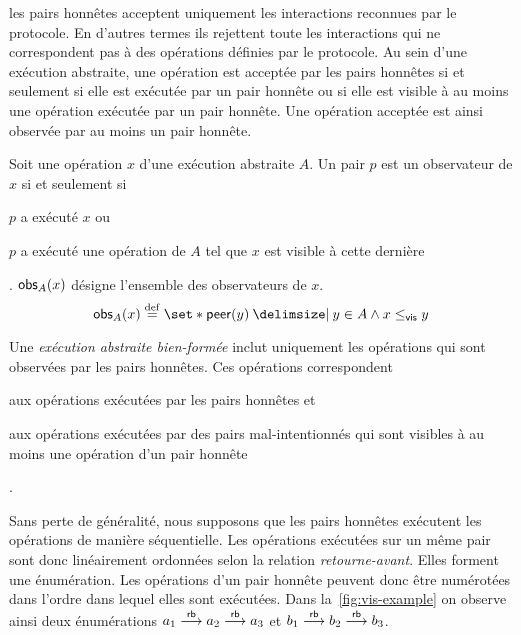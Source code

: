 les pairs honnêtes acceptent uniquement les interactions reconnues par le protocole.
En d'autres termes ils rejettent toute les interactions qui ne correspondent pas à des opérations définies par le protocole.
Au sein d'une exécution abstraite, une opération est acceptée par les pairs honnêtes si et seulement si elle est exécutée par un pair honnête ou si elle est visible à au moins une opération exécutée par un pair honnête.
Une opération acceptée est ainsi observée par au moins un pair honnête.

\begin{definition}[Observateurs]\label{def:op-obs}
Soit une opération $x$ d'une exécution abstraite $A$.
Un pair $p$ est un observateur de $x$ si et seulement si \begin{inlinelist}\item $p$ a exécuté $x$ ou \item $p$ a exécuté une opération de $A$ tel que $x$ est visible à cette dernière\end{inlinelist}.
$\operatorname{\mathsf{obs}}_A(x)$ désigne l'ensemble des observateurs de $x$.
\begin{equation*}
  \trm{obs}_A(x) \defeq \set*{ \trm{peer}(y) \given y \in A \land x \viseq y}
\end{equation*}
\end{definition}

Une \emph{exécution abstraite bien-formée} inclut uniquement les opérations qui sont observées par les pairs honnêtes.
Ces opérations correspondent \begin{inlinelist}
    \item aux opérations exécutées par les pairs honnêtes et
    \item aux opérations exécutées par des pairs mal-intentionnés qui sont visibles à au moins une opération d'un pair honnête
\end{inlinelist}.

Sans perte de généralité, nous supposons que les pairs honnêtes exécutent les opérations de manière séquentielle.
Les opérations exécutées sur un même pair sont donc linéairement ordonnées selon la relation \emph{retourne-avant}.
Elles forment une énumération.
Les opérations d'un pair honnête peuvent donc être numérotées dans l'ordre dans lequel elles sont exécutées.
Dans la~\autoref{fig:vis-example} on observe ainsi deux énumérations $a_1 \overset{\mathsf{rb}}{\longrightarrow} a_2 \overset{\mathsf{rb}}{\longrightarrow} a_3$ et $b_1 \overset{\mathsf{rb}}{\longrightarrow} b_2 \overset{\mathsf{rb}}{\longrightarrow} b_3$.

